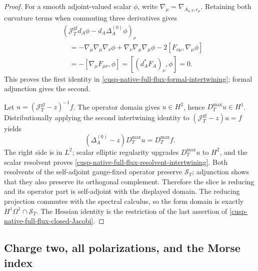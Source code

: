 \begin{proof}
For a smooth adjoint-valued scalar \(\phi\), write
\(\nabla_\mu=\nabla_{A_{\eta,T},e_\mu}\).  Retaining both curvature terms
when commuting three derivatives gives
\begin{align*}
 &(\mathcal J_T^{\mathrm{gf}}d_A\phi
       -d_A\Delta_A^{(0)}\phi)_\nu\\
 &\quad=-\nabla_\mu\nabla_\mu\nabla_\nu\phi
       +\nabla_\nu\nabla_\mu\nabla_\mu\phi
       -2[F_{\nu\mu},\nabla_\mu\phi]\\
 &\quad=-[\nabla_\mu F_{\mu\nu},\phi]
       =[(d_A^*F_A)_\nu,\phi]=0.
\end{align*}
This proves the first identity in
\cref{cusp-native-full-flux-formal-intertwining}; formal adjunction gives the
second.

Let \(u=(\mathcal J_T^{\mathrm{gf}}-z)^{-1}f\).  The operator domain gives
\(u\in H^2\), hence \(D_T^{\max}u\in H^1\).  Distributionally applying the
second intertwining identity to
\((\mathcal J_T^{\mathrm{gf}}-z)u=f\) yields
\[
 (\Delta_A^{(0)}-z)D_T^{\max}u=D_T^{\max}f.
\]
The right side is in \(L^2\); scalar elliptic regularity upgrades
\(D_T^{\max}u\) to \(H^2\), and the scalar resolvent proves
\cref{cusp-native-full-flux-resolvent-intertwining}.  Both resolvents of the
self-adjoint gauge-fixed operator preserve \(\mathscr S_T\); adjunction shows
that they also preserve its orthogonal complement.  Therefore the slice is
reducing and its operator part is self-adjoint with the displayed domain.
The reducing projection commutes with the spectral calculus, so the form
domain is exactly \(H^1\Omega^1\cap\mathscr S_T\).  The Hessian identity is
the restriction of the last assertion of
\cref{cusp-native-full-flux-closed-Jacobi}.
\end{proof}

\subsection{Charge two, all polarizations, and the Morse index}

